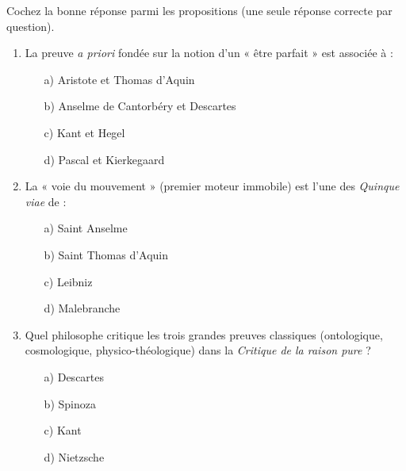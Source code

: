 \documentclass[11pt]{article}
\begin{document}
\begin{exercice}
Cochez la bonne réponse parmi les propositions (une seule réponse correcte par question).
\begin{enumerate}
    \item La preuve \textit{a priori} fondée sur la notion d'un « être parfait » est associée à :
    \begin{itemize}
        \item[a)] Aristote et Thomas d'Aquin
        \item[b)] Anselme de Cantorbéry et Descartes
        \item[c)] Kant et Hegel
        \item[d)] Pascal et Kierkegaard
    \end{itemize}
    \item La « voie du mouvement » (premier moteur immobile) est l'une des \textit{Quinque viae} de :
    \begin{itemize}
        \item[a)] Saint Anselme
        \item[b)] Saint Thomas d'Aquin
        \item[c)] Leibniz
        \item[d)] Malebranche
    \end{itemize}
    \item Quel philosophe critique les trois grandes preuves classiques (ontologique, cosmologique, physico-théologique) dans la \textit{Critique de la raison pure} ?
    \begin{itemize}
        \item[a)] Descartes
        \item[b)] Spinoza
        \item[c)] Kant
        \item[d)] Nietzsche
    \end{itemize}
\end{enumerate}
\end{exercice}
\end{document}
